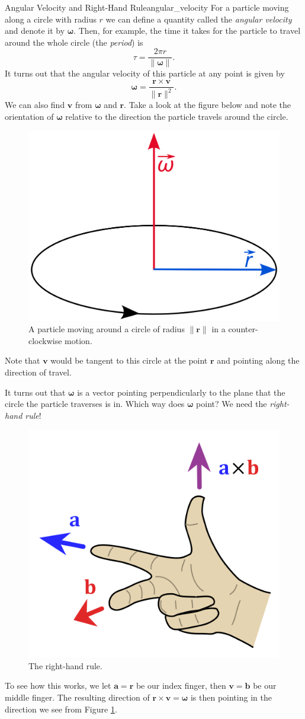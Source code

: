         \begin{ex}{Angular Velocity and Right-Hand Rule}{angular_velocity}
        For a particle moving along a circle with radius $r$ we can define a quantity called the \emph{angular velocity} and denote it by $\mathbf{\omega}$.  Then, for example, the time it takes for the particle to travel around the whole circle (the \emph{period}) is
        \[
        \tau = \frac{2\pi r}{\|\mathbf{\mathbf{\omega}}\|}.
        \]
        It turns out that the angular velocity of this particle at any point is given by
        \[
        \mathbf{\omega}=\frac{\mathbf{r}\times \mathbf{v}}{\|\mathbf{r}\|^2}.
        \]
        We can also find $\mathbf{v}$ from $\mathbf{\omega}$ and $\mathbf{r}$. Take a look at the figure below and note the orientation of $\mathbf{\omega}$ relative to the direction the particle travels around the circle.
        \begin{center}
        \begin{figure}[H]
            \centering
            \includegraphics[width=.3\textwidth]{Figures/Angular_velocity.png}
            \caption{A particle moving around a circle of radius $\|\mathbf{r}\|$ in a counter-clockwise motion.}
            \label{angular-momentum}
        \end{figure}
        \end{center}
        Note that $\mathbf{v}$ would be tangent to this circle at the point $\mathbf{r}$ and pointing along the direction of travel.
        
        It turns out that $\mathbf{\omega}$ is a vector pointing perpendicularly to the plane that the circle the particle traverses is in. Which way does $\mathbf{\omega}$ point? We need the \emph{right-hand rule}!
        \begin{center}
        \begin{figure}[H]
            \centering
            \includegraphics[width=.3\textwidth]{Figures/507px-Right_hand_rule_cross_product.png}
            \caption{The right-hand rule.}
        \end{figure}
        \end{center}
        To see how this works, we let $\mathbf{a}=\mathbf{r}$ be our index finger, then $\mathbf{v}=\mathbf{b}$ be our middle finger.  The resulting direction of $\mathbf{r}\times \mathbf{v}=\mathbf{\omega}$ is then pointing in the direction we see from Figure \ref{angular-momentum}.
        \end{ex}
        
